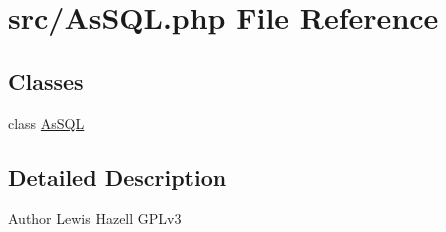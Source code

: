 \hypertarget{AsSQL_8php}{\section{src/\-As\-S\-Q\-L.php File Reference}
\label{AsSQL_8php}
}
\subsection*{Classes}
\begin{DoxyCompactItemize}
\item 
class \hyperlink{classAsSQL}{As\-S\-Q\-L}
\end{DoxyCompactItemize}


\subsection{Detailed Description}
\begin{DoxyAuthor}{Author}
Lewis Hazell  G\-P\-Lv3 
\end{DoxyAuthor}
